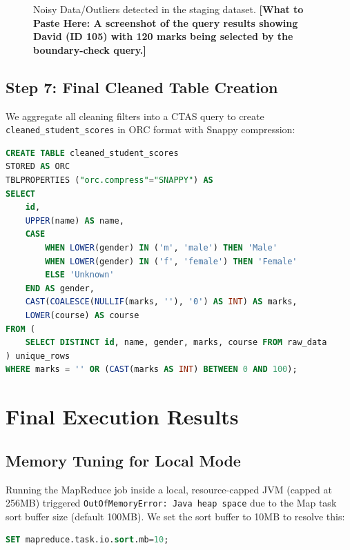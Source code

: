 \documentclass[11pt,a4paper]{article}
\begin{document}
\begin{figure}[H]
\centering
{}
\caption{Noisy Data/Outliers detected in the staging dataset. \textbf{[What to Paste Here: A screenshot of the query results showing David (ID 105) with 120 marks being selected by the boundary-check query.]}}
\label{fig:outliers}
\end{figure}

\subsection{Step 7: Final Cleaned Table Creation}
We aggregate all cleaning filters into a CTAS query to create \texttt{cleaned\_student\_scores} in ORC format with Snappy compression:
\begin{lstlisting}[language=SQL]
CREATE TABLE cleaned_student_scores
STORED AS ORC
TBLPROPERTIES ("orc.compress"="SNAPPY") AS
SELECT 
    id,
    UPPER(name) AS name,
    CASE
        WHEN LOWER(gender) IN ('m', 'male') THEN 'Male'
        WHEN LOWER(gender) IN ('f', 'female') THEN 'Female'
        ELSE 'Unknown'
    END AS gender,
    CAST(COALESCE(NULLIF(marks, ''), '0') AS INT) AS marks,
    LOWER(course) AS course
FROM (
    SELECT DISTINCT id, name, gender, marks, course FROM raw_data
) unique_rows
WHERE marks = '' OR (CAST(marks AS INT) BETWEEN 0 AND 100);
\end{lstlisting}

\newpage
\section{Final Execution Results}

\subsection{Memory Tuning for Local Mode}
Running the MapReduce job inside a local, resource-capped JVM (capped at 256MB) triggered \texttt{OutOfMemoryError: Java heap space} due to the Map task sort buffer size (default 100MB). We set the sort buffer to 10MB to resolve this:
\begin{lstlisting}[language=SQL]
SET mapreduce.task.io.sort.mb=10;
\end{lstlisting}
\end{document}
